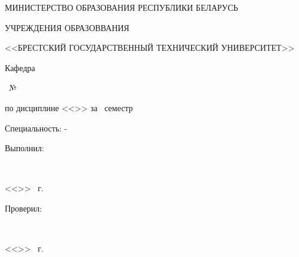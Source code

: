\begin{center}
    МИНИСТЕРСТВО ОБРАЗОВАНИЯ РЕСПУБЛИКИ БЕЛАРУСЬ

    УЧРЕЖДЕНИЯ ОБРАЗОВВАНИЯ

    <<БРЕСТСКИЙ ГОСУДАРСТВЕННЫЙ ТЕХНИЧЕСКИЙ УНИВЕРСИТЕТ>>

    Кафедра \titlePageKafedra
\end{center}

\vfill

\begin{center}
    \titlePageWorkType~№\titlePageWorkNumber

    по дисциплине <<\titlePageLesson>> за \titlePageSemestr~семестр

    Специальность: \titlePageStudentGroupLetter-\titlePageStudentGroupNumber
\end{center}

\vfill

\begin{flushright}
    \begin{minipage}[t]{7cm}
        Выполнил:

        \titlePageStudentType

        \titlePageStudentSurname~\titlePageStudentName

        <<\underline{\hspace{0.5cm}}>> \underline{\hspace{2cm}} \ESKDtheYear~г. 

        \hspace{0pt}

        Проверил:

        \titlePageTeacherType

        \titlePageTeacherSurname~\titlePageTeacherName

        <<\underline{\hspace{0.5cm}}>> \underline{\hspace{2cm}} \ESKDtheYear~г. 
    \end{minipage}
\end{flushright}

\vfill

\begin{center}
    \titlePageCity~\ESKDtheYear
\end{center}
